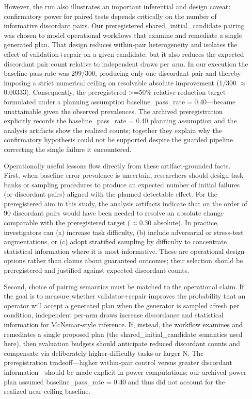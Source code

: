 \documentclass[conference]{IEEEtran}
\begin{document}
However, the run also illustrates an important inferential and design caveat: confirmatory power for paired tests depends critically on the number of informative discordant pairs. Our preregistered shared\_initial\_candidate pairing was chosen to model operational workflows that examine and remediate a single generated plan. That design reduces within‑pair heterogeneity and isolates the effect of validation+repair on a given candidate, but it also reduces the expected discordant pair count relative to independent draws per arm. In our execution the baseline pass rate was 299/300, producing only one discordant pair and thereby imposing a strict numerical ceiling on resolvable absolute improvement (1/300 \ensuremath{\approx} 0.00333). Consequently, the preregistered >=50\% relative‑reduction target---formulated under a planning assumption baseline\_pass\_rate = 0.40---became unattainable given the observed prevalences. The archived preregistration explicitly records the baseline\_pass\_rate = 0.40 planning assumption and the analysis artifacts show the realized counts; together they explain why the confirmatory hypothesis could not be supported despite the guarded pipeline correcting the single failure it encountered.

Operationally useful lessons flow directly from these artifact‑grounded facts. First, when baseline error prevalence is uncertain, researchers should design task banks or sampling procedures to produce an expected number of initial failures (or discordant pairs) aligned with the planned detectable effect. For the preregistered aim in this study, the analysis artifacts indicate that on the order of 90 discordant pairs would have been needed to resolve an absolute change comparable with the preregistered target (\ensuremath{\approx}0.30 absolute). In practice, investigators can (a) increase task difficulty, (b) include adversarial or stress‑test augmentations, or (c) adopt stratified sampling by difficulty to concentrate statistical information where it is most informative. These are operational design options rather than claims about guaranteed outcomes; their selection should be preregistered and justified against expected discordant counts.

Second, choice of pairing semantics must be matched to the operational claim. If the goal is to measure whether validator+repair improves the probability that an operator will accept a generated plan when the generator is sampled afresh per condition, independent per‑arm draws increase discordance and statistical information for McNemar‑style inference. If, instead, the workflow examines and remediates a single proposed plan (the shared\_initial\_candidate semantics used here), then evaluation budgets should anticipate reduced discordant counts and compensate via deliberately higher‑difficulty tasks or larger N. The preregistration tradeoff---higher within‑pair control versus greater discordant information---should be made explicit in power computations; our archived power plan assumed baseline\_pass\_rate = 0.40 and thus did not account for the realized near‑ceiling baseline.
\end{document}
